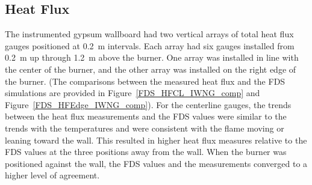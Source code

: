 \documentclass[twoside]{uocthesis}
\begin{document}
{\subsection{Heat Flux}

The instrumented gypsum wallboard had two vertical arrays of total heat flux gauges positioned at 0.2~m intervals.  Each array had six gauges installed from 0.2~m up through 1.2~m above the burner.  One array was installed in line with the center of the burner, and the other array was installed on the right edge of the burner.  (The comparisons between the measured heat flux and the FDS simulations are provided in Figure~\ref{FDS_HFCL_IWNG_comp} and Figure~\ref{FDS_HFEdge_IWNG_comp}).  For the centerline gauges, the trends between the heat flux measurements and the FDS values were similar to the trends with the temperatures and were consistent with the flame moving or leaning toward the wall.  This resulted in higher heat flux measures relative to the FDS values at the three positions away from the wall. When the burner was positioned against the wall, the FDS values and the measurements converged to a higher level of agreement. 

}
\end{document}
